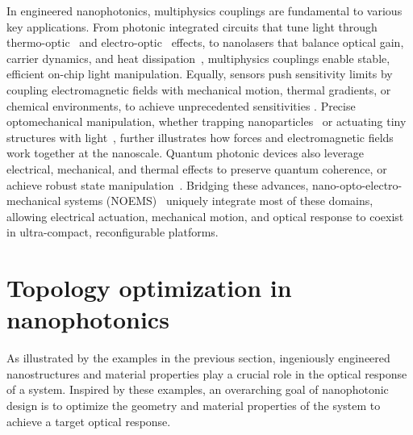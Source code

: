 In engineered nanophotonics, multiphysics couplings are fundamental to various key applications. From photonic integrated circuits that tune light through  
thermo-optic~\cite{TOPS_1, TOPS_2, TOPS_3, program, PIC} and electro-optic~\cite{modu, modu1, modu2, pockels} effects, to nanolasers that balance optical gain, carrier dynamics, and heat dissipation~\cite{laser,laser_pic}, multiphysics couplings enable stable, efficient on-chip light manipulation. Equally, sensors  
push sensitivity limits by coupling electromagnetic fields with mechanical motion, thermal gradients, or chemical environments, to achieve unprecedented sensitivities \cite{therm_sensing,sensing, weakforce}.
Precise optomechanical manipulation, wheth\-er trapping nanoparticles~\cite{ashkin_acceleration_1970} or actuating tiny structures with light~\cite{ivanyi_optically_2024}, further illustrates how forces and electromagnetic fields work together at the nanoscale. Quantum photonic devices 
also leverage electrical, mechanical, and thermal effects to preserve quantum coherence, or achieve robust state manipulation~\cite{quant_eo, Andrews_2014, Xi_2025}. Bridging these advances, nano-opto-electro-mechanical systems (NOEMS)~\cite{NOEMS} uniquely integrate most of these  
domains, allowing electrical actuation, mechanical motion, and optical response to coexist in ultra-compact, reconfigurable platforms. 



\section{Topology optimization in nanophotonics}\label{intro:to}

As illustrated by the examples in the previous section, ingeniously engineered nanostructures and material properties play a crucial role in the
optical response of a system. Inspired by these examples, an overarching goal of nanophotonic
design is to optimize the geometry and material properties of the system to achieve a target
optical response.

